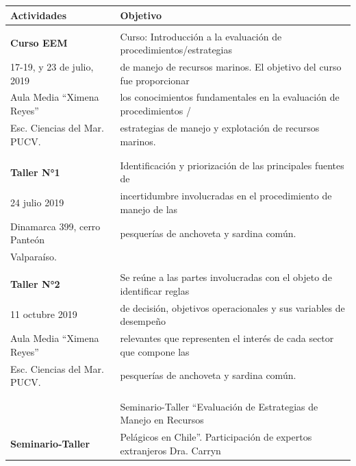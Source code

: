 \documentclass[
  spanish,
]{article}
\begin{document}
\begin{table}[h]
  \centering
  \resizebox{16cm}{!} {
  \begin{tabular}{|l|l|}
  \hline
    Actividades                  & Objetivo \\ \hline
                                 & \\
    \textbf{Curso EEM}           & Curso: Introducción a la evaluación de procedimientos/estrategias \\
    17-19, y 23 de julio, 2019   & de manejo de recursos marinos. El objetivo del curso fue proporcionar \\
    Aula Media “Ximena Reyes”    & los conocimientos fundamentales en la evaluación de procedimientos / \\
    Esc. Ciencias del Mar. PUCV. & estrategias de manejo y explotación de recursos marinos. \\
                                 & \\ \hline
                                 & \\
    \textbf{Taller N°1}          & Identificación y priorización de las principales fuentes de \\
    24 julio 2019                & incertidumbre involucradas en el procedimiento de manejo de las \\
    Dinamarca 399, cerro Panteón & pesquerías de anchoveta y sardina común. \\
    Valparaíso.                  & \\ \hline
                                 &  \\
    \textbf{Taller N°2}          & Se reúne a las partes involucradas con el objeto de identificar reglas \\
    11 octubre 2019              & de decisión, objetivos operacionales y sus variables de desempeño \\
    Aula Media “Ximena Reyes”    & relevantes que representen el interés de cada sector que compone las \\ 
    Esc. Ciencias del Mar. PUCV. & pesquerías de anchoveta y sardina común. \\ 
                                 & \\ \hline
                                 &  \\
                                 & Seminario-Taller “Evaluación de Estrategias de Manejo en Recursos \\
    \textbf{Seminario-Taller}    & Pelágicos en Chile”.  Participación de expertos extranjeros Dra. Carryn \\

\end{tabular}}
\end{table}
\end{document}
